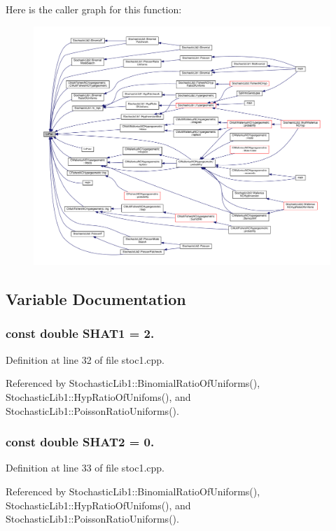 Here is the caller graph for this function\-:\nopagebreak
\begin{figure}[H]
\begin{center}
\leavevmode
\includegraphics[width=350pt]{rnd_2stoc1_8cpp_a1a00e98fecbda89aebeea3ae04d20748_icgraph}
\end{center}
\end{figure}




\subsection{Variable Documentation}
\subsubsection[{S\-H\-A\-T1}]{\setlength{\rightskip}{0pt plus 5cm}const double S\-H\-A\-T1 = 2.}\label{rnd_2stoc1_8cpp_a8e7d4cd2385c204ac111149508e32205}


Definition at line 32 of file stoc1.\-cpp.



Referenced by Stochastic\-Lib1\-::\-Binomial\-Ratio\-Of\-Uniforms(), Stochastic\-Lib1\-::\-Hyp\-Ratio\-Of\-Unifoms(), and Stochastic\-Lib1\-::\-Poisson\-Ratio\-Uniforms().

\subsubsection[{S\-H\-A\-T2}]{\setlength{\rightskip}{0pt plus 5cm}const double S\-H\-A\-T2 = 0.}\label{rnd_2stoc1_8cpp_a6eed178ee9af56838f8e0453ab986dc0}


Definition at line 33 of file stoc1.\-cpp.



Referenced by Stochastic\-Lib1\-::\-Binomial\-Ratio\-Of\-Uniforms(), Stochastic\-Lib1\-::\-Hyp\-Ratio\-Of\-Unifoms(), and Stochastic\-Lib1\-::\-Poisson\-Ratio\-Uniforms().

